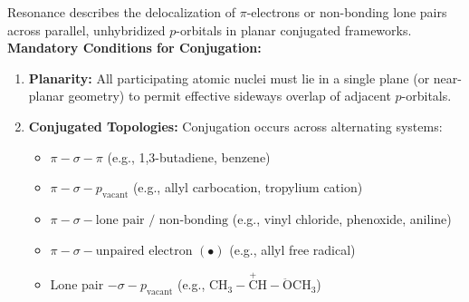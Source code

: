 \documentclass[10pt,twoside,openright]{book}
\begin{document}
\begin{conceptbox}
Resonance describes the delocalization of $\pi$-electrons or non-bonding lone pairs across parallel, unhybridized $p$-orbitals in planar conjugated frameworks.
\textbf{Mandatory Conditions for Conjugation:}
\begin{enumerate}[leftmargin=*]
  \item \textbf{Planarity:} All participating atomic nuclei must lie in a single plane (or near-planar geometry) to permit effective sideways overlap of adjacent $p$-orbitals.
  \item \textbf{Conjugated Topologies:} Conjugation occurs across alternating systems:
  \begin{itemize}
    \item $\pi - \sigma - \pi$ (e.g., 1,3-butadiene, benzene)
    \item $\pi - \sigma - p_{\text{vacant}}$ (e.g., allyl carbocation, tropylium cation)
    \item $\pi - \sigma - \text{lone pair / non-bonding}$ (e.g., vinyl chloride, phenoxide, aniline)
    \item $\pi - \sigma - \text{unpaired electron } (\bullet)$ (e.g., allyl free radical)
    \item Lone pair $- \sigma - p_{\text{vacant}}$ (e.g., $\mathrm{CH_3-\overset{+}{C}H-\ddot{O}CH_3}$)
  \end{itemize}
\end{enumerate}
\end{conceptbox}
\end{document}
